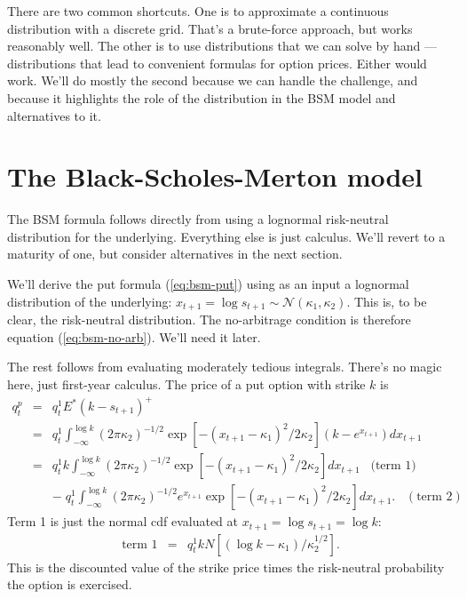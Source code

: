 \documentclass[11pt]{article}
\begin{document}
There are two common shortcuts.
One is to approximate a continuous distribution with a discrete grid.
That's a brute-force approach, but works reasonably well.
The other is to use distributions that we can solve by hand ---
distributions that lead to convenient formulas for option prices.
Either would work.
We'll do mostly the second because we can handle the challenge,
and because it highlights the role of the distribution in
the BSM model and alternatives to it.


\section{The Black-Scholes-Merton model}


The BSM formula follows directly from using a lognormal risk-neutral distribution
for the underlying.  Everything else is just calculus.
We'll revert to a maturity of one, but consider alternatives in the next section.

We'll derive the put formula (\ref{eq:bsm-put})
using as an input a lognormal distribution
of the underlying:
$x_{t+1} = \log s_{t+1} \sim \mathcal{N} (\kappa_1,\kappa_2)$.
This is, to be clear, the risk-neutral distribution.
The no-arbitrage condition is therefore equation (\ref{eq:bsm-no-arb}).
We'll need it later.

The rest follows from evaluating moderately tedious integrals.
There's no magic here, just first-year calculus.
The price of a put option with strike $k$ is
\begin{eqnarray*}
    q^p_t &=&  q^1_t E^* (k - s_{t+1})^+  \\
            &=& q^1_t \int_{-\infty}^{\log k} (2 \pi \kappa_2)^{-1/2}
                    \exp[ - (x_{t+1} - \kappa_1)^2/2\kappa_2]
                    \left( k - e^{x_{t+1}} \right) d x_{t+1} \\
            &=& q^1_t k \int_{-\infty}^{\log k} (2 \pi \kappa_2)^{-1/2}
                    \exp[ - (x_{t+1} - \kappa_1)^2/2\kappa_2] d x_{t+1}
                    \;\;\; \mbox{(term 1)}\\
            &&    - \; q^1_t \int_{-\infty}^{\log k} (2 \pi \kappa_2)^{-1/2}
                    e^{x_{t+1}} \exp[ - (x_{t+1} - \kappa_1)^2/2\kappa_2] d x_{t+1} .
                     \;\;\; (\mbox{term 2})
\end{eqnarray*}
Term 1 is just the normal cdf evaluated at $x_{t+1} = \log s_{t+1} = \log k$:
\begin{eqnarray*}
    \mbox{term 1} &=&  q^1_t k N [ (\log k - \kappa_1)/\kappa_2^{1/2}] .
\end{eqnarray*}
This is the discounted value of the strike price times
the risk-neutral probability the option is exercised.
\end{document}
